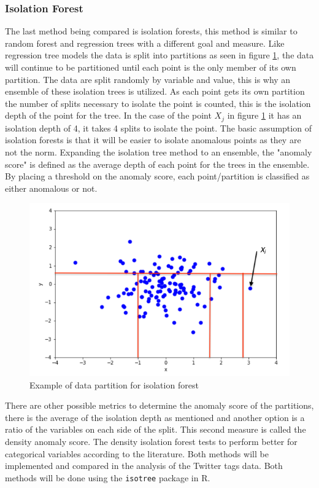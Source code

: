\documentclass{article}
\begin{document}
\subsubsection{Isolation Forest}
The last method being compared is isolation forests, this method is similar to random forest and regression trees with a different goal and measure. Like regression tree models the data is split into partitions as seen in figure \ref{fig:iso_fig}, the data will continue to be partitioned until each point is the only member of its own partition. The data are split randomly by variable and value, this is why an ensemble of these isolation trees is utilized. As each point gets its own partition the number of splits necessary to isolate the point is counted, this is the isolation depth of the point for the tree. In the case of the point $X_j$ in figure \ref{fig:iso_fig} it has an isolation depth of 4, it takes 4 splits to isolate the point. The basic assumption of isolation forests is that it will be easier to isolate anomalous points as they are not the norm. Expanding the isolation tree method to an ensemble, the "anomaly score" is defined as the average depth of each point for the trees in the ensemble. By placing a threshold on the anomaly score, each point/partition is classified as either anomalous or not.

\begin{figure}[!ht]
    \centering
    \includegraphics[width=.6\textwidth]{../Isolating_an_Anomalous_Point.png}
    \caption{Example of data partition for isolation forest}
    \label{fig:iso_fig}
\end{figure}

There are other possible metrics to determine the anomaly score of the partitions, there is the average of the isolation depth as mentioned and another option is a ratio of the variables on each side of the split. This second measure is called the density anomaly score. The density isolation forest tests to perform better for categorical variables according to the literature. Both methods will be implemented and compared in the analysis of the Twitter tags data. Both methods will be done using the \texttt{isotree} package in R.
\end{document}
